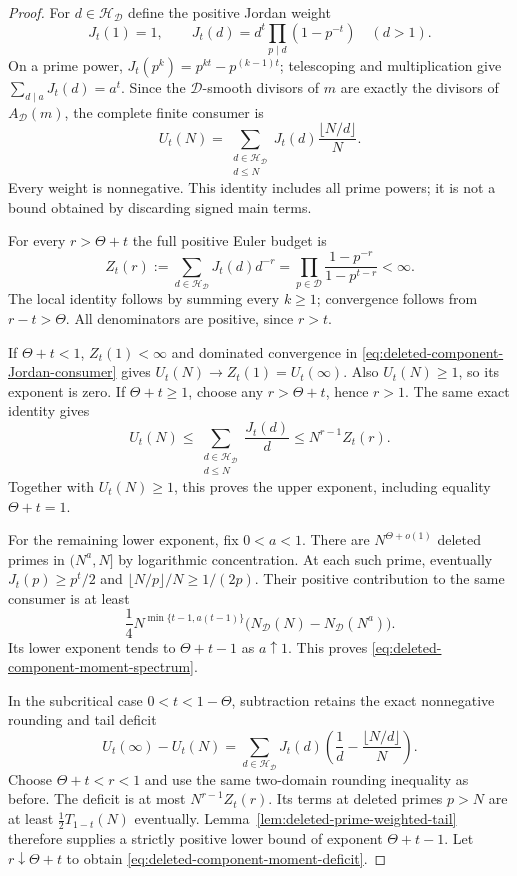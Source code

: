 \documentclass[11pt]{article}
\theoremstyle{definition}
\begin{document}
\begin{proof}
For $d\in\mathcal H_{\mathcal D}$ define the positive Jordan weight
\[
 J_t(1)=1,\qquad
 J_t(d)=d^t\prod_{p\mid d}(1-p^{-t})\quad(d>1).
\]
On a prime power,
$J_t(p^k)=p^{kt}-p^{(k-1)t}$; telescoping and multiplication give
$\sum_{d\mid a}J_t(d)=a^t$.
Since the $\mathcal D$-smooth divisors of $m$ are exactly the
divisors of $A_{\mathcal D}(m)$, the complete finite consumer is
\begin{equation}
 U_t(N)=
 \sum_{\substack{d\in\mathcal H_{\mathcal D}\\d\le N}}
             J_t(d)\frac{\lfloor N/d\rfloor}{N}.
 \label{eq:deleted-component-Jordan-consumer}
\end{equation}
Every weight is nonnegative. This identity includes all prime powers;
it is not a bound obtained by discarding signed main terms.

For every $r>\Theta+t$ the full positive Euler budget is
\[
 Z_t(r):=\sum_{d\in\mathcal H_{\mathcal D}}J_t(d)d^{-r}
      =\prod_{p\in\mathcal D}\frac{1-p^{-r}}{1-p^{t-r}}<\infty.
\]
The local identity follows by summing every $k\ge1$;
convergence follows from $r-t>\Theta$.
All denominators are positive, since $r>t$.

If $\Theta+t<1$, $Z_t(1)<\infty$ and dominated convergence in
\eqref{eq:deleted-component-Jordan-consumer} gives
$U_t(N)\to Z_t(1)=U_t(\infty)$.
Also $U_t(N)\ge1$, so its exponent is zero.
If $\Theta+t\ge1$, choose any $r>\Theta+t$, hence $r>1$.
The same exact identity gives
\[
 U_t(N)\le\sum_{\substack{d\in\mathcal H_{\mathcal D}\\d\le N}}
                        \frac{J_t(d)}d
          \le N^{r-1}Z_t(r).
\]
Together with $U_t(N)\ge1$, this proves the upper exponent,
including equality $\Theta+t=1$.

For the remaining lower exponent, fix $0<a<1$.
There are $N^{\Theta+o(1)}$ deleted primes in $(N^a,N]$ by
logarithmic concentration.
At each such prime, eventually $J_t(p)\ge p^t/2$ and
$\lfloor N/p\rfloor/N\ge1/(2p)$.
Their positive contribution to the same consumer is at least
\[
 \frac14 N^{\min\{t-1,a(t-1)\}}
       \bigl(N_{\mathcal D}(N)-N_{\mathcal D}(N^a)\bigr).
\]
Its lower exponent tends to $\Theta+t-1$ as $a\uparrow1$.
This proves \eqref{eq:deleted-component-moment-spectrum}.

In the subcritical case $0<t<1-\Theta$, subtraction retains the
exact nonnegative rounding and tail deficit
\[
 U_t(\infty)-U_t(N)=
 \sum_{d\in\mathcal H_{\mathcal D}}J_t(d)
       \left(\frac1d-\frac{\lfloor N/d\rfloor}{N}\right).
\]
Choose $\Theta+t<r<1$ and use the same two-domain rounding inequality
as before. The deficit is at most $N^{r-1}Z_t(r)$.
Its terms at deleted primes $p>N$ are at least
$\tfrac12 T_{1-t}(N)$ eventually.
Lemma~\ref{lem:deleted-prime-weighted-tail} therefore supplies a
strictly positive lower bound of exponent $\Theta+t-1$.
Let $r\downarrow\Theta+t$ to obtain
\eqref{eq:deleted-component-moment-deficit}.


\end{proof}
\end{document}
